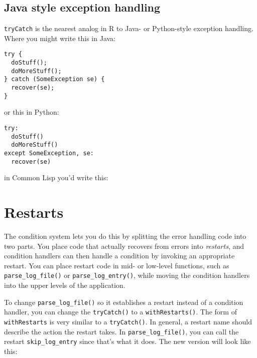 \subsection{Java style exception handling}

\texttt{tryCatch} is the nearest analog in R to Java- or Python-style
exception handling. Where you might write this in Java:

\begin{verbatim}
try {
  doStuff();
  doMoreStuff();
} catch (SomeException se) {
  recover(se);
}
\end{verbatim}

or this in Python:

\begin{verbatim}
try:
  doStuff()
  doMoreStuff()
except SomeException, se:
  recover(se)
\end{verbatim}

in Common Lisp you'd write this:

\begin{Shaded}
\begin{Highlighting}[]
\NormalTok{(\{}
  \NormalTok{()}
  \NormalTok{()}
\NormalTok{\}, } 
\NormalTok{\})}
\end{Highlighting}
\end{Shaded}

\section{Restarts}

The condition system lets you do this by splitting the error handling
code into two parts. You place code that actually recovers from errors
into \emph{restarts}, and condition handlers can then handle a condition
by invoking an appropriate restart. You can place restart code in mid-
or low-level functions, such as \texttt{parse\_log\_file()} or
\texttt{parse\_log\_entry()}, while moving the condition handlers into
the upper levels of the application.

To change \texttt{parse\_log\_file()} so it establishes a restart
instead of a condition handler, you can change the \texttt{tryCatch()}
to a \texttt{withRestarts()}. The form of \texttt{withRestarts} is very
similar to a \texttt{tryCatch()}. In general, a restart name should
describe the action the restart takes. In \texttt{parse\_log\_file()},
you can call the restart \texttt{skip\_log\_entry} since that's what it
does. The new version will look like this:

